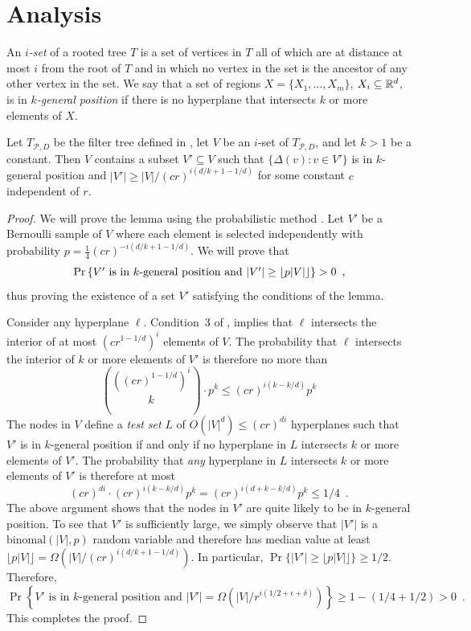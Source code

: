 \documentclass{patmorin}
\begin{document}
\section{Analysis}

An \emph{$i$-set} of a rooted tree $T$ is a set of vertices in $T$ all
of which are at distance at most $i$ from the root of $T$ and in which no
vertex in the set is the ancestor of any other vertex in the set.  We say
that a set of regions $X=\{X_1,\ldots,X_m\}$, $X_i\subseteq\mathbb{R}^d$, is in
\emph{$k$-general position} if there is no hyperplane that intersects $k$
or more elements of $X$.

\begin{lem}
  Let $T_{\mathcal{P},D}$ be the filter tree defined in
  , let $V$ be an $i$-set of $T_{\mathcal{P},D}$,
  and let $k>1$ be a constant.  Then $V$ contains a subset $V'\subseteq V$
  such that $\{\Delta(v): v\in V'\}$ is in $k$-general position and
  $|V'|\ge |V|/(cr)^{i(d/k+1-1/d)}$ for some constant $c$ independent of $r$.
\end{lem}

\begin{proof}
  We will prove the lemma using the probabilistic method \cite{as08}.
  Let $V'$ be a Bernoulli sample of $V$ where each element is selected
  independently with probability $p=\frac{1}{4}(cr)^{-i(d/k+1-1/d)}$. We
  will prove that
  \[
     \Pr\left\{
        \mbox{$V'$ is in $k$-general position 
          and $|V'| \ge {\left\lfloor p|V| \right\rfloor}$}
      \right\} > 0 \enspace ,
  \]
  thus proving the existence of a set $V'$ satisfying the conditions of
  the lemma.

  Consider any hyperplane $\ell$. Condition~3 of
  , implies that $\ell$ intersects the
  interior of at most $(cr^{1-1/d})^{i}$ elements of $V$.
  The probability that $\ell$ intersects the interior of $k$ or more
  elements of $V'$ is therefore no more than
  \[
    \binom{((cr)^{1-1/d})^{i}}{k}\cdot p^k
    \le (cr)^{i(k-k/d)}p^k
  \]
  The nodes in $V$ define a \emph{test set} $L$ of $O(|V|^d)\le (cr)^{di}$
  hyperplanes such that $V'$ is in $k$-general position if and only
  if no hyperplane in $L$ intersects $k$ or more elements of $V'$. The
  probability that \emph{any} hyperplane in $L$ intersects $k$ or more
  elements of $V'$ is therefore at most
  \[
    (cr)^{di}\cdot(cr)^{i(k-k/d)}p^k = (cr)^{i(d+k-k/d)}p^k \le 1/4 \enspace .
  \]
  The above argument shows that the nodes in $V'$ are quite likely to
  be in $k$-general position. To see that $V'$ is sufficiently large,
  we simply observe that $|V'|$ is a $\mathrm{binomal}(|V|,p)$
  random variable and therefore has median value at least
  $\lfloor{p|V|}\rfloor=\Omega(|V|/(cr)^{i(d/k+1-1/d)})$.  In particular,
  $\Pr\{|V'|\ge \lfloor{p|V|}\rfloor\}\ge 1/2$.  Therefore,
  \[
     \Pr\left\{
        \mbox{$V'$ is in $k$-general position 
          and $|V'|=\Omega(|V|/r^{i(1/2+\epsilon+\delta)})$}
      \right\} \ge 1- (1/4 + 1/2) > 0 \enspace .
  \]
  This completes the proof.
\end{proof}
\end{document}

